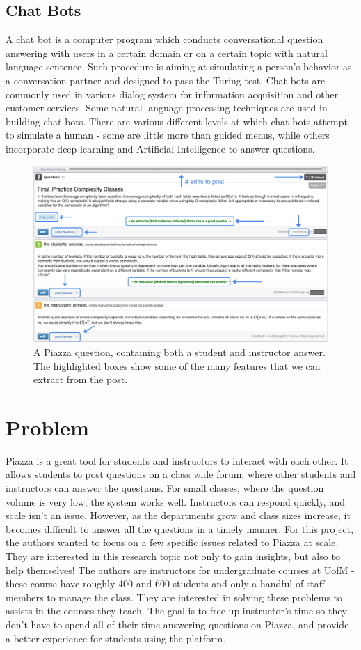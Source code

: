 \documentclass[sigconf]{acmart}
\begin{document}
\subsection{Chat Bots}
A chat bot is a computer program which conducts conversational question answering with users in a certain domain or on a certain topic with natural language sentence. Such procedure is aiming at simulating a person’s behavior as a conversation partner and designed to pass the Turing test. Chat bots are commonly used in various dialog system for information acquisition and other customer services. Some natural language processing techniques are used in building chat bots. There are various different levels at which chat bots attempt to simulate a human - some are little more than guided menus, while others incorporate deep learning and Artificial Intelligence to answer questions.

\begin{figure}
\includegraphics[width=\textwidth]{piazza_stats}
\caption{A Piazza question, containing both a student and instructor answer. The highlighted boxes show some of the many features that we can extract from the post.}
\end{figure}

\section{Problem}
Piazza is a great tool for students and instructors to interact with each other. It allows students to post questions on a class wide forum, where other students and instructors can answer the questions. For small classes, where the question volume is very low, the system works well. Instructors can respond quickly, and scale isn't an issue. However, as the departments grow and class sizes increase, it becomes difficult to answer all the questions in a timely manner. For this project, the authors wanted to focus on a few specific issues related to Piazza at scale. They are interested in this research topic not only to gain insights, but also to help themselves! The authors are instructors for undergraduate courses at UofM - these course have roughly 400 and 600 students and only a handful of staff members to manage the class. They are interested in solving these problems to assists in the courses they teach. The goal is to free up instructor's time so they don't have to spend all of their time answering questions on Piazza, and provide a better experience for students using the platform.
\end{document}

